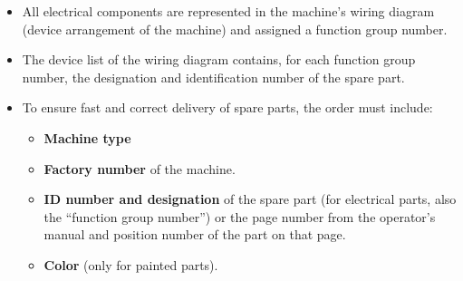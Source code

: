 \begin{itemize}
    \item All electrical components are represented in the machine’s wiring diagram  
          (device arrangement of the machine) and assigned a function group number.
    \item The device list of the wiring diagram contains, for each function group number,  
          the designation and identification number of the spare part.
    \item To ensure fast and correct delivery of spare parts, the order must include:
    \begin{itemize}
        \item \textbf{Machine type}
        \item \textbf{Factory number} of the machine.
        \item \textbf{ID number and designation} of the spare part (for electrical parts,  
              also the \enquote{function group number}) or the page number from the  
              operator’s manual and position number of the part on that page.
        \item \textbf{Color} (only for painted parts).
    \end{itemize}
\end{itemize}
